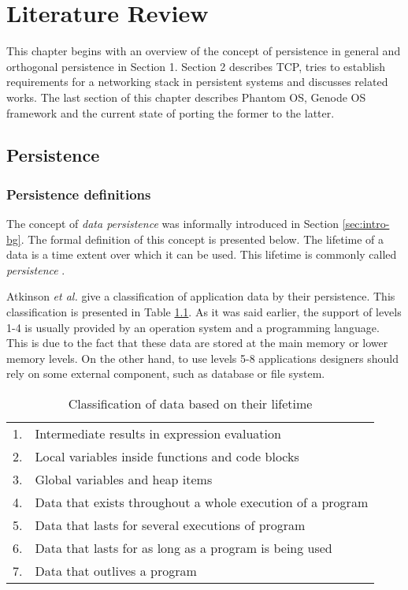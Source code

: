 \chapter{Literature Review}
\label{chap:lr}

This chapter begins with an overview of the concept of persistence in general
and orthogonal persistence in Section 1. Section 2 describes TCP, tries to
establish requirements for a networking stack in persistent systems and
discusses related works. The last section of this chapter describes Phantom OS,
Genode OS framework and the current state of porting the former to the latter.

\section{Persistence}
\subsection{Persistence definitions}

The concept of \textit{data persistence} was informally introduced in Section
\ref{sec:intro-bg}. The formal definition of this concept is presented below.
The lifetime of a data is a time extent over which it can be used. This
lifetime is commonly called \textit{persistence} \cite{atkinson1983ps}. 

Atkinson \textit{et al.} \cite{atkinson1995orthogonally,atkinson1983ps} give a
classification of application data by their persistence. This classification is
presented in Table \ref{tab:data_lifetimes}. As it was said earlier, the
support of levels 1-4 is usually provided by an operation system and a
programming language. This is due to the fact that these data are stored at the
main memory or lower memory levels.  On the other hand, to use levels 5-8
applications designers should rely on some external component, such as database
or file system. 

\begin{longtable}{cl}
\caption[Classification of data based on their lifetime]{Classification of data
based on their lifetime} 
\label{tab:data_lifetimes} \\
\hline
1. & Intermediate results in expression evaluation \\
2. & Local variables inside functions and code blocks \\
3. & Global variables and heap items \\
4. & Data that exists throughout a whole execution of a program \\
5. & Data that lasts for several executions of program \\
6. & Data that lasts for as long as a program is being used \\
7. & Data that outlives a program \\
\hline
\end{longtable}

